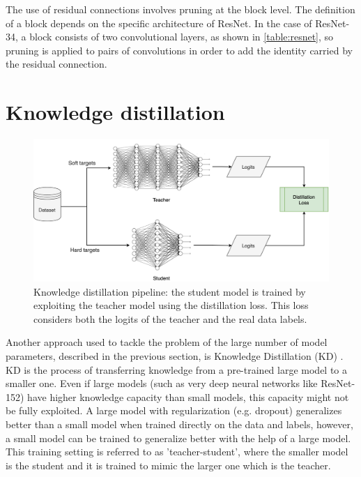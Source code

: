 The use of residual connections involves pruning at the block level.
The definition of a block depends on the specific  architecture of ResNet. In the case of ResNet-34, a block consists of two convolutional layers, as shown in \autoref{table:resnet}, so pruning is applied to pairs of convolutions in order to add the identity carried by the residual connection.

\section{Knowledge distillation}
\label{sec:method-kd}

\begin{figure}[H]%
	\centering

    \begin{center}
        \includegraphics[width=\columnwidth]{images/kd.drawio.png}
    \end{center}

	\caption{Knowledge distillation pipeline: the student model is trained by exploiting the teacher model using the distillation loss. This loss considers both the logits of the teacher and the real data labels.}%
	\label{fig:kd}%
\end{figure}

Another approach used to tackle the problem of the large number of model parameters, described in the previous section, is Knowledge Distillation (KD) \cite{hinton2015distilling}. KD is the process of transferring knowledge from a pre-trained large model to a smaller one. Even if large models (such as very deep neural networks like ResNet-152) have higher knowledge capacity than small models, this capacity might not be fully exploited. A large model with regularization (e.g. dropout) generalizes better than a small model when trained directly on the data and labels, however, a small model can be trained to generalize better with the help of a large model. This training setting is referred to as 'teacher-student', where the smaller model is the student and it is trained to mimic the larger one which is the teacher.

